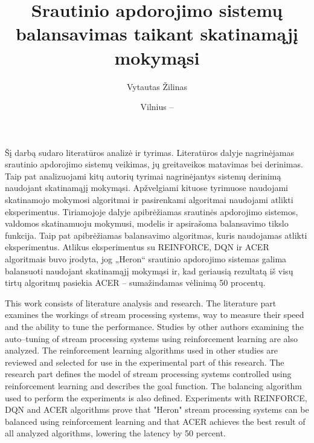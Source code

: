 \documentclass{VUMIFPSbakalaurinis}
\title{Srautinio apdorojimo sistemų balansavimas taikant skatinamąjį mokymąsi}
\author{Vytautas Žilinas}
\date{Vilnius – \the\year}
\begin{document}
 
\maketitle

\cleardoublepage{}
\setcounter{page}{2}

Šį darbą sudaro literatūros analizė ir tyrimas. Literatūros dalyje nagrinėjamas srautinio apdorojimo sistemų veikimas, jų greitaveikos matavimas bei derinimas. Taip pat analizuojami kitų autorių tyrimai nagrinėjantys sistemų derinimą naudojant skatinamąjį mokymąsi. Apžvelgiami kituose tyrimuose naudojami skatinamojo mokymosi algoritmai ir pasirenkami algoritmai naudojami atlikti eksperimentus. Tiriamojoje dalyje apibrėžiamas srautinės apdorojimo sistemos, valdomos skatinamuoju mokymusi, modelis ir apsirašoma balansavimo tikslo funkcija. Taip pat apibrėžiamas balansavimo algoritmas, kuris naudojamas atlikti eksperimentus. Atlikus eksperimentus su REINFORCE, DQN ir ACER algoritmais buvo įrodyta, jog „Heron“ srautinio apdorojimo sistemas galima balansuoti naudojant skatinamąjį mokymąsi ir, kad geriausią rezultatą iš visų tirtų algoritmų pasiekia ACER – sumažindamas vėlinimą 50 procentų.

This work consists of literature analysis and research. The literature part examines the workings of stream processing systems, way to measure their speed and the ability to tune the performance. Studies by other authors examining the auto–tuning of stream processing systems using reinforcement learning are also analyzed. The reinforcement learning algorithms used in other studies are reviewed and selected for use in the experimental part of this research. The research part defines the model of stream processing systems controlled using reinforcement learning and describes the goal function. The balancing algorithm used to perform the experiments is also defined. Experiments with REINFORCE, DQN and ACER algorithms prove that "Heron" stream processing systems can be balanced using reinforcement learning and that ACER achieves the best result of all analyzed algorithms, lowering the latency by 50 percent.

\tableofcontents

\end{document}
